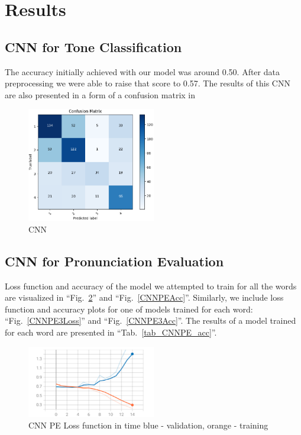 \documentclass[conference]{IEEEtran}
\begin{document}
\section{Results}

\subsection{CNN for Tone Classification}

The accuracy initially achieved with our model was around 0.50. After data preprocessing we were able to raise that score to 0.57.
The results of this CNN are also presented in a form of a confusion matrix in 

\begin{figure}[hbtp]
    \centerline{\includegraphics[width=0.5\textwidth]{Figures/ToneCNN_Matrix.png}}
    \caption{CNN }
    \label{fig_ToneCNN_Mat} %
    \end{figure}

\subsection{CNN for Pronunciation Evaluation}

Loss function and accuracy of the model we attempted to train for all the words are visualized in ``Fig.~\ref{CNNPELoss}'' and ``Fig.~\ref{CNNPEAcc}''.
Similarly, we include loss function and accuracy plots for one of models trained for each word: ``Fig.~\ref{CNNPE3Loss}'' and ``Fig.~\ref{CNNPE3Acc}''.
The results of a model trained for each word are presented in ``Tab.~\ref{tab_CNNPE_acc}''.

\begin{figure}[hbtp]
    \centerline{\includegraphics[width=0.5\textwidth]{Figures/Fig_CNN_PE_loss.png}}
    \caption{CNN PE Loss function in time \textbar \; blue - validation, orange - training}
    \label{CNNPELoss} %
    \end{figure}
\end{document}
